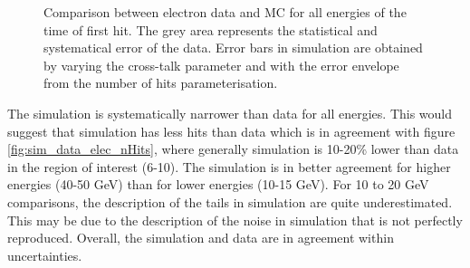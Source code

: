 \documentclass[twoside,a4paper,11pt]{article}
\begin{document}
\begin{figure}[htbp]
	\hfill
	\hfill
	\hfill
	\caption[]{Comparison between electron data and MC for all energies of the time of first hit. The grey area represents the statistical and systematical error of the data. Error bars in simulation are obtained by varying the cross-talk parameter and with the error envelope from the number of hits parameterisation.}
	\label{fig:sim_data_elec}
\end{figure}
The simulation is systematically narrower than data for all energies. This would suggest that simulation has less hits than data which is in agreement with figure \ref{fig:sim_data_elec_nHits}, where generally simulation is 10-20\% lower than data in the region of interest (6-10). The simulation is in better agreement for higher energies (40-50 GeV) than for lower energies (10-15 GeV). For 10 to 20 GeV comparisons, the description of the tails in simulation are quite underestimated. This may be due to the description of the noise in simulation that is not perfectly reproduced. Overall, the simulation and data are in agreement within uncertainties.
\end{document}
